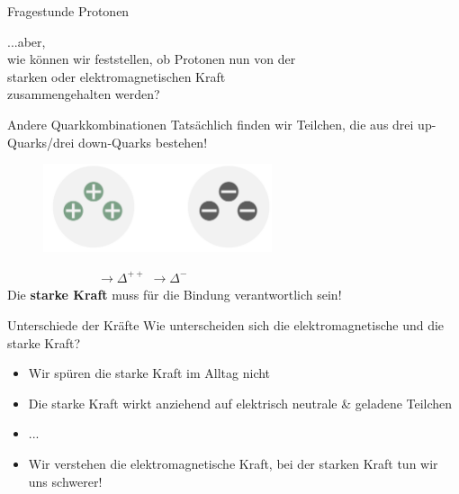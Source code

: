 \begin{frame}{Fragestunde Protonen}
\begin{center} \Large
        ...aber, \\ wie können wir feststellen, ob Protonen nun von der\\ starken oder elektromagnetischen Kraft \\zusammengehalten werden? 
\end{center}

\end{frame}
\begin{frame}{Andere Quarkkombinationen}
Tatsächlich finden wir Teilchen, die aus drei  up-Quarks/drei down-Quarks bestehen!
    \begin{figure}[htb]
        \includegraphics[width=0.6\textwidth]{Figures Introductory Lecture/Standard Model/DeltaBaryons.png}
        \label{fig:strong_force_2}
    \end{figure}\pause
    $\hspace{3cm}\rightarrow \Delta^{++}$\hspace{3cm} $\rightarrow \Delta^{-}$\\ \vspace{0.5cm}
     Die \textbf{starke Kraft} muss für die Bindung verantwortlich sein!
\end{frame}
\begin{frame}{Unterschiede der Kräfte}
Wie unterscheiden sich die elektromagnetische und die starke Kraft?
\pause
\begin{itemize}
    \item Wir spüren die starke Kraft  im Alltag nicht
    \item Die starke Kraft wirkt anziehend auf elektrisch neutrale \& geladene Teilchen
    \item ... \pause
    \item[\ding{43}] Wir verstehen die elektromagnetische Kraft, bei der starken Kraft tun wir uns schwerer!
\end{itemize}
\end{frame}
